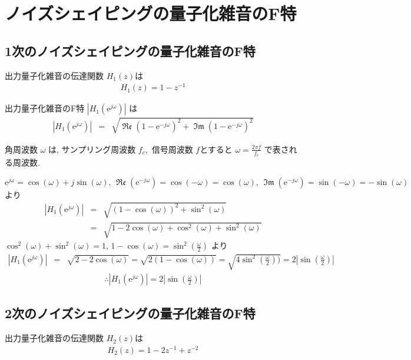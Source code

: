 \documentclass[a4j]{jarticle}
\begin{document}
\renewcommand\Re{\operatorname{\mathfrak{Re}}}
\renewcommand\Im{\operatorname{\mathfrak{Im}}}
\section{ノイズシェイピングの量子化雑音のF特}
\subsection{1次のノイズシェイピングの量子化雑音のF特}
出力量子化雑音の伝達関数 \( H_1(z) \)は
\begin{eqnarray}
H_1(z) = 1 - z^{-1}
\end{eqnarray}

出力量子化雑音のF特 \( |H_1(\mathrm{e}^{j\omega})| \) は
\begin{eqnarray*}
|H_1(\mathrm{e}^{j\omega})| &=& \sqrt{ \Re \left( 1 - \mathrm{e}^{-j\omega} \right)^2 + \Im \left( 1 - \mathrm{e}^{-j\omega} \right)^2 }
\end{eqnarray*}

角周波数 \( \omega \) は, サンプリング周波数 \( f_c \),\, 信号周波数 \( f \)とすると \( \omega = \frac{2\pi f}{f_c} \)
で表される周波数.

\( \mathrm{e}^{j\omega} = \cos(\omega) + j\sin(\omega),\,
\Re \left( \mathrm{e}^{-j\omega} \right) = \cos(-\omega) = \cos(\omega),\,
\Im \left( \mathrm{e}^{-j\omega} \right) = \sin(-\omega) = -\sin(\omega)\)より
\begin{eqnarray*}
|H_1(\mathrm{e}^{j\omega})| &=& \sqrt{ (1-\cos(\omega))^2 + \sin^2(\omega) } \\
                 &=& \sqrt{ 1 -2\cos(\omega) + \cos^2(\omega) + \sin^2(\omega) }
\end{eqnarray*}
\( \cos^2(\omega) + \sin^2(\omega) = 1,\, 1-\cos(\omega) = \sin^2(\frac{\omega}{2}) \) より
\begin{eqnarray*}
|H_1(\mathrm{e}^{j\omega})| &=& \sqrt{ 2 -2\cos(\omega) } = \sqrt{ 2(1 -\cos(\omega)) } = \sqrt{ 4\sin^2(\frac{\omega}{2})) } = 2|\sin(\frac{\omega}{2})|
\end{eqnarray*}
\begin{eqnarray}
\therefore |H_1(\mathrm{e}^{j\omega})| = 2|\sin(\frac{\omega}{2})|
\end{eqnarray}

\subsection{2次のノイズシェイピングの量子化雑音のF特}
出力量子化雑音の伝達関数 \( H_2(z) \)は
\begin{eqnarray}
H_2(z) = 1 - 2z^{-1} + z^{-2}
\end{eqnarray}
\end{document}
